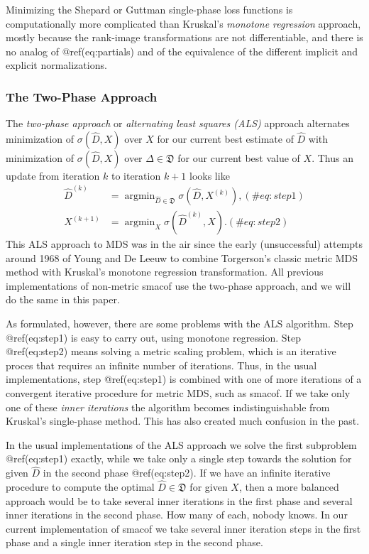 \documentclass[
  12pt,
  letterpaper,
  DIV=11,
  numbers=noendperiod]{scrartcl}
\theoremstyle{plain}
\theoremstyle{remark}
\begin{document}
Minimizing the Shepard or Guttman single-phase loss functions is
computationally more complicated than Kruskal's \emph{monotone
regression} approach, mostly because the rank-image transformations are
not differentiable, and there is no analog of @ref(eq:partials) and of
the equivalence of the different implicit and explicit normalizations.

\subsubsection{The Two-Phase Approach}\label{the-two-phase-approach}

The \emph{two-phase approach} or \emph{alternating least squares (ALS)}
approach alternates minimization of \(\sigma(\hat D,X)\) over \(X\) for
our current best estimate of \(\hat D\) with minimization of
\(\sigma(\hat D,X)\) over \(\Delta\in\mathfrak{D}\) for our current best
value of \(X\). Thus an update from iteration \(k\) to iteration \(k+1\)
looks like \begin{subequations}
\begin{align}
\hat D^{(k)}&=\mathop{\text{argmin}}_{\hat D\in\mathfrak{D}}\sigma(\hat D,X^{(k)}),(\#eq:step1)\\
X^{(k+1)}&=\mathop{\text{argmin}}_X\sigma(\hat D^{(k)},X).(\#eq:step2)
\end{align} 
\end{subequations} This ALS approach to MDS was in the air since the
early (unsuccessful) attempts around 1968 of Young and De Leeuw to
combine Torgerson's classic metric MDS method with Kruskal's monotone
regression transformation. All previous implementations of non-metric
smacof use the two-phase approach, and we will do the same in this
paper.

As formulated, however, there are some problems with the ALS algorithm.
Step @ref(eq:step1) is easy to carry out, using monotone regression.
Step @ref(eq:step2) means solving a metric scaling problem, which is an
iterative proces that requires an infinite number of iterations. Thus,
in the usual implementations, step @ref(eq:step1) is combined with one
of more iterations of a convergent iterative procedure for metric MDS,
such as smacof. If we take only one of these \emph{inner iterations} the
algorithm becomes indistinguishable from Kruskal's single-phase method.
This has also created much confusion in the past.

In the usual implementations of the ALS approach we solve the first
subproblem @ref(eq:step1) exactly, while we take only a single step
towards the solution for given \(\hat D\) in the second phase
@ref(eq:step2). If we have an infinite iterative procedure to compute
the optimal \(\hat D\in\mathfrak{D}\) for given \(X\), then a more
balanced approach would be to take several inner iterations in the first
phase and several inner iterations in the second phase. How many of
each, nobody knows. In our current implementation of smacof we take
several inner iteration steps in the first phase and a single inner
iteration step in the second phase.
\end{document}

